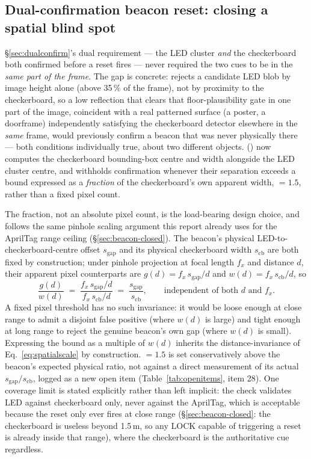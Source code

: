 \subsection{Dual-confirmation beacon reset: closing a spatial blind spot}
\label{sec:july24spatial}
\S\ref{sec:dualconfirm}'s dual requirement — the LED cluster \emph{and} the
checkerboard both confirmed before a reset fires — never required the two
cues to be in the \emph{same part of the frame}. The gap is concrete:
 rejects a candidate LED blob by image height alone
(above 35\,\% of the frame), not by proximity to the checkerboard, so a
low reflection that clears that floor-plausibility gate in one part of the
image, coincident with a real patterned surface (a poster, a doorframe)
independently satisfying the checkerboard detector elsewhere in the
\emph{same} frame, would previously confirm a beacon that was never
physically there — both conditions individually true, about two different
objects.  ()
now computes the checkerboard bounding-box centre and width alongside the
LED cluster centre, and withholds confirmation whenever their separation
exceeds a bound expressed as a \emph{fraction} of the checkerboard's own
apparent width, $=1.5$, rather than a fixed
pixel count.

The fraction, not an absolute pixel count, is the load-bearing design
choice, and follows the same pinhole scaling argument this report already
uses for the AprilTag range ceiling (\S\ref{sec:beacon-closed}). The
beacon's physical LED-to-checkerboard-centre offset $s_{\text{gap}}$ and
its physical checkerboard width $s_{\text{cb}}$ are both fixed by
construction; under pinhole projection at focal length $f_x$ and distance
$d$, their apparent pixel counterparts are $g(d) = f_x\,s_{\text{gap}}/d$
and $w(d) = f_x\,s_{\text{cb}}/d$, so
\begin{equation}
\frac{g(d)}{w(d)} \;=\; \frac{f_x\,s_{\text{gap}}/d}{f_x\,s_{\text{cb}}/d}
\;=\; \frac{s_{\text{gap}}}{s_{\text{cb}}},
\qquad \text{independent of both } d \text{ and } f_x.
\label{eq:spatialscale}
\end{equation}
A fixed pixel threshold has no such invariance: it would be loose enough at
close range to admit a disjoint false positive (where $w(d)$ is large) and
tight enough at long range to reject the genuine beacon's own gap (where
$w(d)$ is small). Expressing the bound as a multiple of $w(d)$ inherits the
distance-invariance of Eq.~\ref{eq:spatialscale} by construction.
$=1.5$ is set conservatively above the
beacon's expected physical ratio, not against a direct measurement of its
actual $s_{\text{gap}}/s_{\text{cb}}$, logged as a new open item
(Table~\ref{tab:openitems}, item 28). One coverage limit is stated
explicitly rather than left implicit: the check validates LED against
checkerboard only, never against the AprilTag, which is acceptable because
the reset only ever fires at close range (\S\ref{sec:beacon-closed}: the
checkerboard is useless beyond 1.5\,m, so any LOCK capable of triggering a
reset is already inside that range), where the checkerboard is the
authoritative cue regardless.

